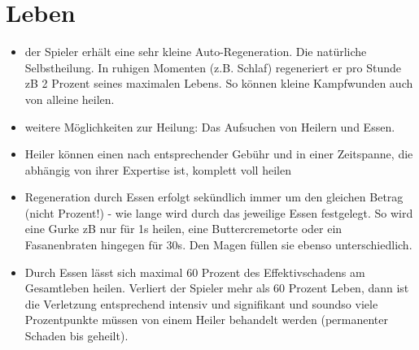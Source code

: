 \chapter{Leben}
\begin{itemize}
	\item der Spieler erhält eine sehr kleine Auto-Regeneration. Die natürliche Selbstheilung. In ruhigen Momenten (z.B. Schlaf) regeneriert er pro Stunde zB 2 Prozent seines maximalen Lebens. So können kleine Kampfwunden auch von alleine heilen.
	\item weitere Möglichkeiten zur Heilung: Das Aufsuchen von Heilern und Essen.
	\item Heiler können einen nach entsprechender Gebühr und in einer Zeitspanne, die abhängig von ihrer Expertise ist, komplett voll heilen
	\item Regeneration durch Essen erfolgt sekündlich immer um den gleichen Betrag (nicht Prozent!) - wie lange wird durch das jeweilige Essen festgelegt. So wird eine Gurke zB nur für 1s heilen, eine Buttercremetorte oder ein Fasanenbraten hingegen für 30s. Den Magen füllen sie ebenso unterschiedlich. 
	\item Durch Essen lässt sich maximal 60 Prozent des Effektivschadens am Gesamtleben heilen. Verliert der Spieler mehr als 60 Prozent Leben, dann ist die Verletzung entsprechend intensiv und signifikant und soundso viele Prozentpunkte müssen von einem Heiler behandelt werden (permanenter Schaden bis geheilt).
\end{itemize}



